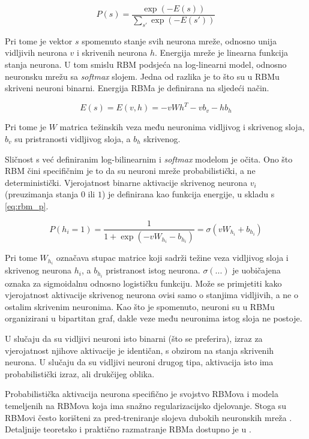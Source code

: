 \documentclass[times, utf8, diplomski, numeric]{fer}
\begin{document}
\begin{equation}
\label{eq:rbm_p}
P(s) = \frac{\exp(-E(s))}{\sum_{s'}\exp(-E(s'))}
\end{equation}

Pri tome je vektor $s$ spomenuto stanje svih neurona mreže, odnosno unija vidljivih neurona $v$ i skrivenih neurona $h$. Energija mreže je linearna funkcija stanja neurona. U tom smislu RBM podsjeća na log-linearni model, odnosno neuronsku mrežu sa \textit{softmax} slojem. Jedna od razlika je to što su u RBMu skriveni neuroni binarni. Energija RBMa je definirana na sljedeći način.

\[
E(s) = E(v, h) = - v W h^T  - v b_v - h b_h
\]

Pri tome je $W$ matrica težinskih veza među neuronima vidljivog i skrivenog sloja, $b_v$ su pristranosti vidljivog sloja, a $b_h$ skrivenog.

Sličnost s već definiranim log-bilinearnim i \textit{softmax} modelom je očita. Ono što RBM čini specifičnim je to da su neuroni mreže probabilistički, a ne deterministički. Vjerojatnost binarne aktivacije skrivenog neurona $v_i$ (preuzimanja stanja $0$ ili $1$) je definirana kao funkcija energije, u skladu s \ref{eq:rbm_p}.

\[
 P(h_i = 1) = \frac{1}{ 1 + \exp \left( - v W_{h_i} - b_{h_i} \right) } = \sigma( v W_{h_i} + b_{h_i} )
\]

Pri tome $W_{h_i}$ označava stupac matrice koji sadrži težine veza vidljivog sloja i skrivenog neurona $h_i$, a $b_{h_i}$ pristranost istog neurona. $\sigma(...)$ je uobičajena oznaka za sigmoidalnu odnosno logističku funkciju. Može se primjetiti kako vjerojatnost aktivacije skrivenog neurona ovisi samo o stanjima vidljivih, a ne o ostalim skrivenim neuronima. Kao što je spomenuto, neuroni su u RBMu organizirani u bipartitan graf, dakle veze među neuronima istog sloja ne postoje.

U slučaju da su vidljivi neuroni isto binarni (što se preferira), izraz za vjerojatnost njihove aktivacije je identičan, s obzirom na stanja skrivenih neurona. U slučaju da su vidljivi neuroni drugog tipa, aktivacija isto ima probabilistički izraz, ali drukčijeg oblika.

Probabilistička aktivacija neurona specifično je svojstvo RBMova i modela temeljenih na RBMova koja ima snažno regularizacijsko djelovanje. Stoga su RBMovi često korišteni za pred-treniranje slojeva dubokih neuronskih mreža \cite{Hinton06afast}. Detaljnije teoretsko i praktično razmatranje RBMa dostupno je u \cite{stamenkovic2014}.
\end{document}
